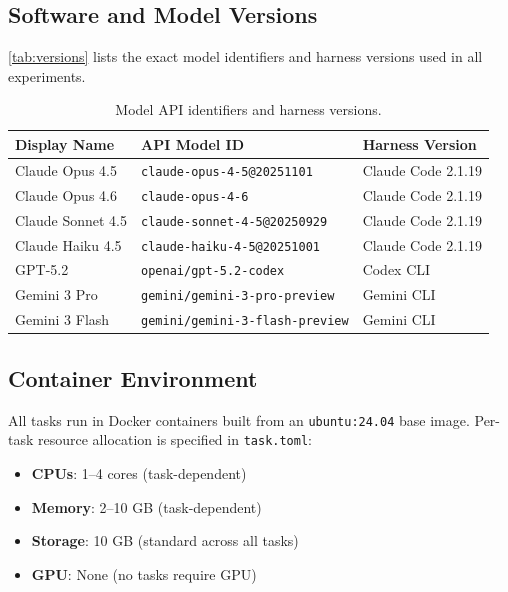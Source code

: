 \subsection{Software and Model Versions}

\autoref{tab:versions} lists the exact model identifiers and harness versions used in all experiments.

\begin{table}[htb]
\centering
\footnotesize
\caption{Model API identifiers and harness versions.}
\label{tab:versions}
\begin{tabular}{lll}
\toprule
\textbf{Display Name} & \textbf{API Model ID} & \textbf{Harness Version} \\
\midrule
Claude Opus 4.5 & \texttt{claude-opus-4-5@20251101} & Claude Code 2.1.19 \\
Claude Opus 4.6 & \texttt{claude-opus-4-6} & Claude Code 2.1.19 \\
Claude Sonnet 4.5 & \texttt{claude-sonnet-4-5@20250929} & Claude Code 2.1.19 \\
Claude Haiku 4.5 & \texttt{claude-haiku-4-5@20251001} & Claude Code 2.1.19 \\
GPT-5.2 & \texttt{openai/gpt-5.2-codex} & Codex CLI \\
Gemini 3 Pro & \texttt{gemini/gemini-3-pro-preview} & Gemini CLI \\
Gemini 3 Flash & \texttt{gemini/gemini-3-flash-preview} & Gemini CLI \\
\bottomrule
\end{tabular}
\end{table}

\subsection{Container Environment}

All tasks run in Docker containers built from an \texttt{ubuntu:24.04} base image. Per-task resource allocation is specified in \texttt{task.toml}:

\begin{itemize}[nosep]
    \item \textbf{CPUs}: 1--4 cores (task-dependent)
    \item \textbf{Memory}: 2--10 GB (task-dependent)
    \item \textbf{Storage}: 10 GB (standard across all tasks)
    \item \textbf{GPU}: None (no tasks require GPU)
\end{itemize}

